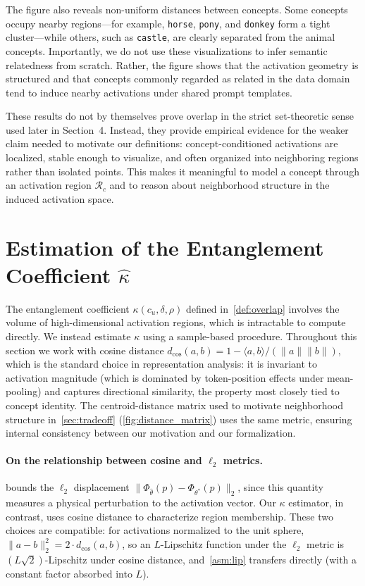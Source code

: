 The figure also reveals non-uniform distances between concepts. Some concepts occupy nearby regions—for example, \texttt{horse}, \texttt{pony}, and \texttt{donkey} form a tight cluster—while others, such as \texttt{castle}, are clearly separated from the animal concepts. Importantly, we do not use these visualizations to infer semantic relatedness from scratch. Rather, the figure shows that the activation geometry is structured and that concepts commonly regarded as related in the data domain tend to induce nearby activations under shared prompt templates.

These results do not by themselves prove overlap in the strict set-theoretic sense used later in Section~4. Instead, they provide empirical evidence for the weaker claim needed to motivate our definitions: concept-conditioned activations are localized, stable enough to visualize, and often organized into neighboring regions rather than isolated points. This makes it meaningful to model a concept through an activation region $\mathcal{R}_c$ and to reason about neighborhood structure in the induced activation space.

\section{Estimation of the Entanglement Coefficient $\hat\kappa$}
\label{app:kappa_estimation}

The entanglement coefficient $\kappa(c_u, \delta, \rho)$ defined in~\cref{def:overlap} involves the volume of high-dimensional activation regions, which is intractable to compute directly. We instead estimate $\kappa$ using a sample-based procedure.
Throughout this section we work with cosine distance $d_{\cos}(a, b) = 1 - \langle a, b \rangle / (\|a\|\|b\|)$, which is the standard choice in representation analysis: it is invariant to activation magnitude (which is dominated by token-position effects under mean-pooling) and captures directional similarity, the property most closely tied to concept identity. 
The centroid-distance matrix used to motivate neighborhood structure in~\cref{sec:tradeoff} (\cref{fig:distance_matrix}) uses the same metric, ensuring internal consistency between our motivation and our formalization.

\paragraph{On the relationship between cosine and $\ell_2$ metrics.}
 bounds the $\ell_2$ displacement $\|\Phi_{\hat\theta}(p) - \Phi_{\theta^*}(p)\|_2$, since this quantity measures a physical perturbation to the activation vector. Our $\kappa$ estimator, in contrast, uses cosine distance to characterize region membership. These two choices are compatible: for activations normalized to the unit sphere, $\|a - b\|_2^2 = 2 \cdot d_{\cos}(a, b)$, so an $L$-Lipschitz function under the $\ell_2$ metric is $(L\sqrt{2})$-Lipschitz under cosine distance, and~\cref{asm:lip} transfers directly (with a constant factor absorbed into $L$). 

